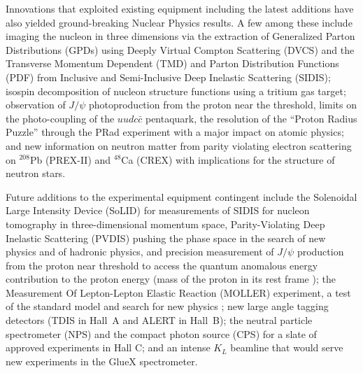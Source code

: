 Innovations that exploited existing equipment including the latest additions have also yielded ground-breaking Nuclear Physics results. A few among these include imaging the nucleon in three dimensions via the extraction of Generalized Parton Distributions (GPDs) using Deeply Virtual Compton Scattering (DVCS) and the Transverse Momentum Dependent (TMD) and Parton Distribution Functions (PDF) from Inclusive and Semi-Inclusive Deep Inelastic Scattering (SIDIS); isospin decomposition of nucleon structure functions using a tritium gas target; observation of $J/\psi$ photoproduction from the proton near the threshold, limits on the photo-coupling of the $uudc\bar{c}$ pentaquark, %
the resolution of the ``Proton Radius Puzzle'' through the PRad experiment with a major impact on atomic physics; and new information on neutron matter from parity violating electron scattering on $^{208}$Pb (PREX-II) and $^{48}$Ca (CREX) with implications for the structure of neutron stars.

Future additions to the experimental equipment contingent include the Solenoidal Large Intensity Device (SoLID) for measurements of SIDIS for nucleon tomography in three-dimensional momentum space, Parity-Violating Deep Inelastic Scattering (PVDIS) pushing the phase space in the search of new physics and of hadronic physics, and precision measurement of $J/\psi$ production from the proton near threshold to access the quantum anomalous energy contribution to the proton energy (mass of the proton in its rest frame ); the Measurement Of Lepton-Lepton Elastic Reaction (MOLLER) experiment, a test of the standard model and search for new physics ; new large angle tagging detectors (TDIS in Hall~A and ALERT in Hall~B); the neutral particle spectrometer (NPS) and the compact photon source (CPS) for a slate of approved experiments in Hall C; and an intense $K_L$ beamline that would serve new experiments in the GlueX spectrometer. 

